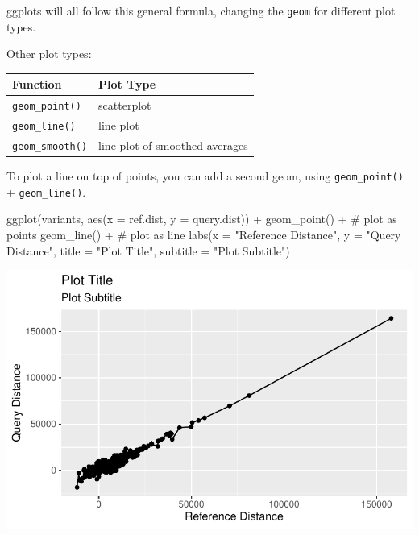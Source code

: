 \documentclass[
  letterpaper,
  DIV=11,
  numbers=noendperiod]{scrreprt}
\newenvironment{Shaded}{\begin{snugshade}}{\end{snugshade}}
\newcommand{\AttributeTok}[1]{\textcolor[rgb]{0.40,0.45,0.13}{#1}}
\newcommand{\CommentTok}[1]{\textcolor[rgb]{0.37,0.37,0.37}{#1}}
\newcommand{\FunctionTok}[1]{\textcolor[rgb]{0.28,0.35,0.67}{#1}}
\newcommand{\NormalTok}[1]{\textcolor[rgb]{0.00,0.23,0.31}{#1}}
\newcommand{\SpecialCharTok}[1]{\textcolor[rgb]{0.37,0.37,0.37}{#1}}
\newcommand{\StringTok}[1]{\textcolor[rgb]{0.13,0.47,0.30}{#1}}
\begin{document}
ggplots will all follow this general formula, changing the \texttt{geom}
for different plot types.

Other plot types:

\begin{longtable}[]{@{}ll@{}}
\toprule\noalign{}
Function & Plot Type \\
\midrule\noalign{}
\endhead
\bottomrule\noalign{}
\endlastfoot
\texttt{geom\_point()} & scatterplot \\
\texttt{geom\_line()} & line plot \\
\texttt{geom\_smooth()} & line plot of smoothed averages \\
\end{longtable}

To plot a line on top of points, you can add a second geom, using
\texttt{geom\_point()} + \texttt{geom\_line()}.

\begin{Shaded}
\begin{Highlighting}[]
\FunctionTok{ggplot}\NormalTok{(variants, }\FunctionTok{aes}\NormalTok{(}\AttributeTok{x =}\NormalTok{ ref.dist, }\AttributeTok{y =}\NormalTok{ query.dist)) }\SpecialCharTok{+}
  \FunctionTok{geom\_point}\NormalTok{() }\SpecialCharTok{+} \CommentTok{\# plot as points}
  \FunctionTok{geom\_line}\NormalTok{() }\SpecialCharTok{+} \CommentTok{\# plot as line}
  \FunctionTok{labs}\NormalTok{(}\AttributeTok{x =} \StringTok{"Reference Distance"}\NormalTok{,}
       \AttributeTok{y =} \StringTok{"Query Distance"}\NormalTok{,}
       \AttributeTok{title =} \StringTok{"Plot Title"}\NormalTok{,}
       \AttributeTok{subtitle =} \StringTok{"Plot Subtitle"}\NormalTok{)}
\end{Highlighting}
\end{Shaded}

\includegraphics{scripts/02_dataViz/class3_files/figure-pdf/unnamed-chunk-12-1.pdf}
\end{document}

